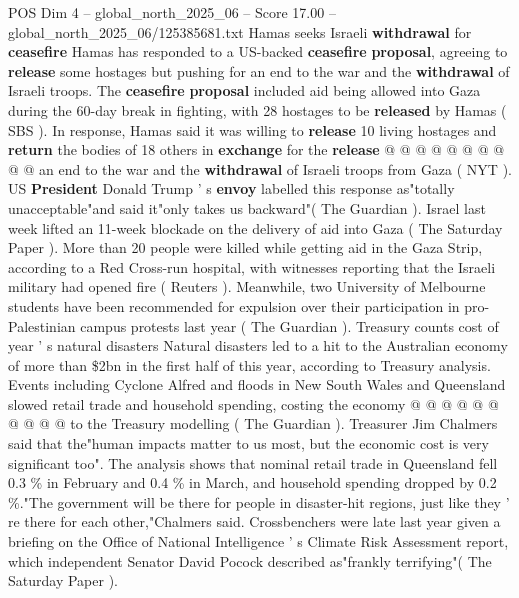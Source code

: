 \begin{textsample}{POS Dim 4 – global\_north\_2025\_06 – Score 17.00 – global\_north\_2025\_06/125385681.txt}
Hamas seeks Israeli \textbf{withdrawal} for \textbf{ceasefire} Hamas has responded to a US-backed \textbf{ceasefire} \textbf{proposal}, agreeing to \textbf{release} some hostages but pushing for an end to the war and the \textbf{withdrawal} of Israeli troops.
The \textbf{ceasefire} \textbf{proposal} included aid being allowed into Gaza during the 60-day break in fighting, with 28 hostages to be \textbf{released} by Hamas ( SBS ).
In response, Hamas said it was willing to \textbf{release} 10 living hostages and \textbf{return} the bodies of 18 others in \textbf{exchange} for the \textbf{release} @ @ @ @ @ @ @ @ @ @ an end to the war and the \textbf{withdrawal} of Israeli troops from Gaza ( NYT ).
US \textbf{President} Donald Trump ' s \textbf{envoy} labelled this response as"totally unacceptable"and said it"only takes us backward"( The Guardian ).
Israel last week lifted an 11-week blockade on the delivery of aid into Gaza ( The Saturday Paper ).
More than 20 people were killed while getting aid in the Gaza Strip, according to a Red Cross-run hospital, with witnesses reporting that the Israeli military had opened fire ( Reuters ).
Meanwhile, two University of Melbourne students have been recommended for expulsion over their participation in pro-Palestinian campus protests last year ( The Guardian ).
Treasury counts cost of year ' s natural disasters Natural disasters led to a hit to the Australian economy of more than \$2bn in the first half of this year, according to Treasury analysis.
Events including Cyclone Alfred and floods in New South Wales and Queensland slowed retail trade and household spending, costing the economy @ @ @ @ @ @ @ @ @ @ to the Treasury modelling ( The Guardian ).
Treasurer Jim Chalmers said that the"human impacts matter to us most, but the economic cost is very significant too".
The analysis shows that nominal retail trade in Queensland fell 0.3 \% in February and 0.4 \% in March, and household spending dropped by 0.2 \%."The government will be there for people in disaster-hit regions, just like they ' re there for each other,"Chalmers said.
Crossbenchers were late last year given a briefing on the Office of National Intelligence ' s Climate Risk Assessment report, which independent Senator David Pocock described as"frankly terrifying"( The Saturday Paper ).

\end{textsample}
